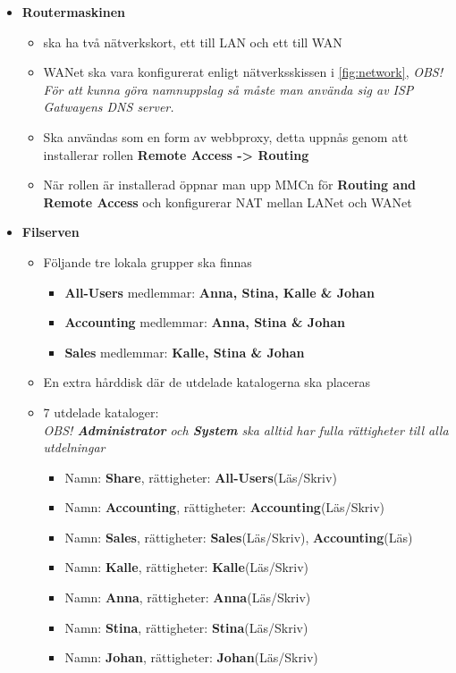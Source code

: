 \documentclass[paper=a4, fontsize=11pt]{report} %
\begin{document}
\begin{itemize}
\begin{itemize}
        \item \textbf{Routermaskinen}
        \begin{itemize}
            \item ska ha två nätverkskort, ett till LAN och ett till WAN
            \item WANet ska vara konfigurerat enligt nätverksskissen i \figurename \ref{fig:network}, \textit{OBS! För att kunna göra namnuppslag så måste man använda sig av ISP Gatwayens DNS server.}
            \item Ska användas som en form av webbproxy, detta uppnås genom att installerar rollen \textbf{Remote Access -> Routing}
            \item När rollen är installerad öppnar man upp MMCn för \textbf{Routing and Remote Access} och konfigurerar NAT mellan LANet och WANet
        \end{itemize}

        \item \textbf{Filserven}
        \begin{itemize}
            \item Följande tre lokala grupper ska finnas
            \begin{itemize}
                \item \textbf{All-Users} medlemmar: \textbf{Anna, Stina, Kalle \& Johan}
                \item \textbf{Accounting} medlemmar: \textbf{Anna, Stina \& Johan}
                \item \textbf{Sales} medlemmar: \textbf{Kalle, Stina \& Johan}
            \end{itemize}
            \item En extra hårddisk där de utdelade katalogerna ska placeras
            \item 7 utdelade kataloger: \\ \textit{OBS! \textbf{Administrator} och \textbf{System} ska alltid har fulla rättigheter till alla utdelningar}
            \begin{itemize}
                \item Namn: \textbf{Share}, rättigheter: \textbf{All-Users}(Läs/Skriv)
                \item Namn: \textbf{Accounting}, rättigheter: \textbf{Accounting}(Läs/Skriv)
                \item Namn: \textbf{Sales}, rättigheter: \textbf{Sales}(Läs/Skriv), \textbf{Accounting}(Läs)
                \item Namn: \textbf{Kalle}, rättigheter: \textbf{Kalle}(Läs/Skriv)
                \item Namn: \textbf{Anna}, rättigheter: \textbf{Anna}(Läs/Skriv)
                \item Namn: \textbf{Stina}, rättigheter: \textbf{Stina}(Läs/Skriv)
                \item Namn: \textbf{Johan}, rättigheter: \textbf{Johan}(Läs/Skriv)
            \end{itemize}
        \end{itemize}
    \end{itemize}
\end{itemize}
\end{document}
